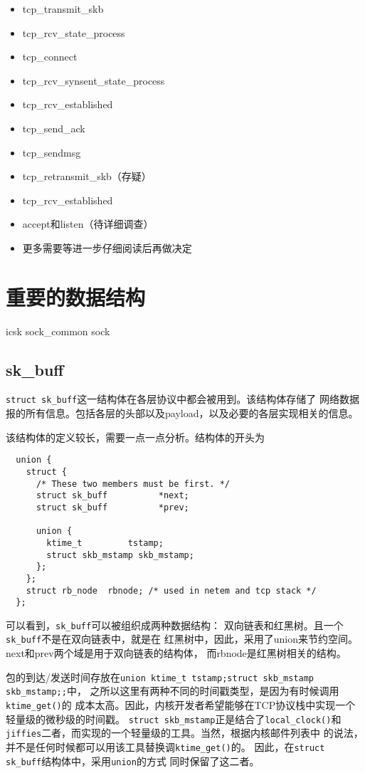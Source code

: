 \documentclass[11pt, a4paper,oneside]{book}
\theoremstyle{ocrenumbox}
\theoremstyle{purplenumbox}
\theoremstyle{blackbox}
\begin{document}
\begin{itemize}
\item
  tcp\_transmit\_skb
\item
  tcp\_rcv\_state\_process
\item
  tcp\_connect
\item
  tcp\_rcv\_synsent\_state\_process
\item
  tcp\_rcv\_established
\item
  tcp\_send\_ack
\item
  tcp\_sendmsg
\item
  tcp\_retransmit\_skb（存疑）
\item
  tcp\_rcv\_established
\item
  accept和listen（待详细调查）
\item
  更多需要等进一步仔细阅读后再做决定
\end{itemize}


\chapter{重要的数据结构}

\minitoc

        icsk
        sock\_common
        sock
\section{sk\_buff}
\label{sec:sk_buff}

\texttt{struct sk_buff}这一结构体在各层协议中都会被用到。该结构体存储了
网络数据报的所有信息。包括各层的头部以及payload，以及必要的各层实现相关的信息。

该结构体的定义较长，需要一点一点分析。结构体的开头为
\begin{verbatim}
  union {
    struct {
      /* These two members must be first. */
      struct sk_buff          *next;
      struct sk_buff          *prev;

      union {
        ktime_t         tstamp;
        struct skb_mstamp skb_mstamp;
      };
    };
    struct rb_node  rbnode; /* used in netem and tcp stack */
  };
\end{verbatim}
可以看到，\texttt{sk_buff}可以被组织成两种数据结构：
双向链表和红黑树。且一个\texttt{sk_buff}不是在双向链表中，就是在
红黑树中，因此，采用了union来节约空间。next和prev两个域是用于双向链表的结构体，
而rbnode是红黑树相关的结构。

包的到达/发送时间存放在\texttt{union {ktime_t tstamp;struct skb_mstamp skb_mstamp;};}中，
之所以这里有两种不同的时间戳类型，是因为有时候调用\texttt{ktime_get()}的
成本太高。因此，内核开发者希望能够在TCP协议栈中实现一个轻量级的微秒级的时间戳。
\texttt{struct skb_mstamp}正是结合了\texttt{local_clock()}和
\texttt{jiffies}二者，而实现的一个轻量级的工具。当然，根据内核邮件列表中
的说法，并不是任何时候都可以用该工具替换调\texttt{ktime_get()}的。
因此，在\texttt{struct sk_buff}结构体中，采用\texttt{union}的方式
同时保留了这二者。
\end{document}
